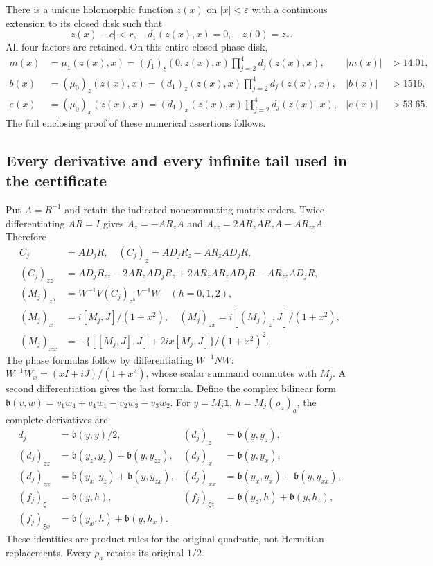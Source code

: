 \documentclass[11pt]{article}
\begin{document}
There is a unique holomorphic function $z(x)$ on $|x|<\varepsilon$
with a continuous extension to its closed disk such that
\[
 |z(x)-c|<r,\quad d_1(z(x),x)=0,\quad z(0)=z_*.
 \tag{UPP3}
\]
All four factors are retained. On this entire closed phase disk,
\[
 \begin{aligned}
 m(x)&=\mu_1(z(x),x)
     =(f_1)_\xi(0,z(x),x)\prod_{j=2}^4d_j(z(x),x),
       &|m(x)|&>14.01,\\
 b(x)&=(\mu_0)_z(z(x),x)
     =(d_1)_z(z(x),x)\prod_{j=2}^4d_j(z(x),x),
       &|b(x)|&>1516,\\
 e(x)&=(\mu_0)_x(z(x),x)
     =(d_1)_x(z(x),x)\prod_{j=2}^4d_j(z(x),x),
       &|e(x)|&>53.65.
 \end{aligned}\tag{UPP4}
\]
The full enclosing proof of these numerical assertions follows.

\subsection{Every derivative and every infinite tail used in the certificate}
Put $A=R^{-1}$ and retain the indicated noncommuting matrix orders.
Twice differentiating $AR=I$ gives
$A_z=-AR_zA$ and $A_{zz}=2AR_zAR_zA-AR_{zz}A$. Therefore
\[
 \begin{aligned}
 C_j&=AD_jR,\quad (C_j)_z=AD_jR_z-AR_zAD_jR,\\
 (C_j)_{zz}&=AD_jR_{zz}-2AR_zAD_jR_z
       +2AR_zAR_zAD_jR-AR_{zz}AD_jR,\\
 (M_j)_{z^h}&=W^{-1}V(C_j)_{z^h}V^{-1}W\quad(h=0,1,2),\\
 (M_j)_x&=i[M_j,J]/(1+x^2),\quad
 (M_j)_{zx}=i[(M_j)_z,J]/(1+x^2),\\
 (M_j)_{xx}&=-\{[[M_j,J],J]+2ix[M_j,J]\}/(1+x^2)^2.
 \end{aligned}\tag{UPP5}
\]
The phase formulas follow by differentiating $W^{-1}NW$:
$W^{-1}W_x=(xI+iJ)/(1+x^2)$, whose scalar summand commutes with
$M_j$. A second differentiation gives the last formula.
Define the complex bilinear form
$\mathfrak b(v,w)=v_1w_4+v_4w_1-v_2w_3-v_3w_2$.
For $y=M_j\mathbf1$, $h=M_j(\rho_a)_a$, the complete derivatives are
\[
 \begin{aligned}
 d_j&=\mathfrak b(y,y)/2,&(d_j)_z&=\mathfrak b(y,y_z),\\
 (d_j)_{zz}&=\mathfrak b(y_z,y_z)+\mathfrak b(y,y_{zz}),&
 (d_j)_x&=\mathfrak b(y,y_x),\\
 (d_j)_{zx}&=\mathfrak b(y_x,y_z)+\mathfrak b(y,y_{zx}),&
 (d_j)_{xx}&=\mathfrak b(y_x,y_x)+\mathfrak b(y,y_{xx}),\\
 (f_j)_\xi&=\mathfrak b(y,h),&
 (f_j)_{\xi z}&=\mathfrak b(y_z,h)+\mathfrak b(y,h_z),\\
 (f_j)_{\xi x}&=\mathfrak b(y_x,h)+\mathfrak b(y,h_x).
 \end{aligned}\tag{UPP6}
\]
These identities are product rules for the original quadratic,
not Hermitian replacements. Every $\rho_a$ retains its original $1/2$.
\end{document}
